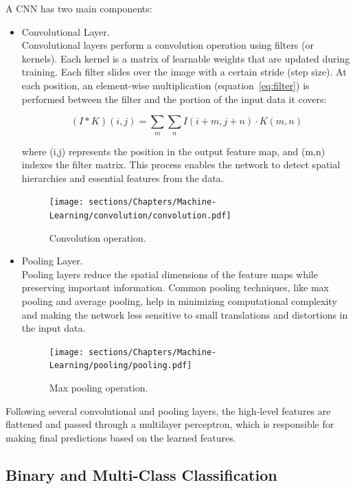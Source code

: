 A CNN has two main components:

\begin{itemize}
    \item Convolutional Layer.\\
    Convolutional layers perform a convolution operation using filters (or kernels).
    Each kernel is a matrix of learnable weights that are updated during training.
    Each filter slides over the image with a certain stride (step size). At each position, 
    an element-wise multiplication (equation~\ref{eq:filter}) is performed between the filter and the portion of the input data it covers:

    \begin{equation}
        (I * K)(i,j)= \sum_m \sum_n I(i+m,j+n) \cdot K(m,n)
    \label{eq:filter}
    \end{equation}

    where (i,j) represents the position in the output feature map, and (m,n) indexes the filter matrix.
    This process enables the network to detect spatial hierarchies and essential features from the data.

    \begin{figure}[h]
    \centering
        \texttt{[image: sections/Chapters/Machine-Learning/convolution/convolution.pdf]}
    \caption{Convolution operation.}
    \end{figure}

    \item Pooling Layer.\\
    Pooling layers reduce the spatial dimensions of the feature maps while preserving important information. Common pooling techniques, 
    like max pooling and average pooling, help in minimizing computational complexity and making the network less sensitive to small translations 
    and distortions in the input data.

    \begin{figure}[h]
    \centering
        \texttt{[image: sections/Chapters/Machine-Learning/pooling/pooling.pdf]}
    \caption{Max pooling operation.}
    \end{figure}
\end{itemize}

Following several convolutional and pooling layers, the high-level features are flattened and passed through a multilayer perceptron, which is
responsible for making final predictions based on the learned features.


\subsection{Binary and Multi-Class Classification}

